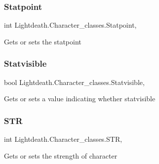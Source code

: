 \subsubsection{\texorpdfstring{Statpoint}{Statpoint}}
{\footnotesize\ttfamily int Lightdeath.\+Character\+\_\+classes.\+Statpoint\hspace{0.3cm}{\ttfamily [get]}, {\ttfamily [set]}}



Gets or sets the statpoint 

\hypertarget{class_lightdeath_1_1_character__classes_a1fa3c352e68bc979f5f4bd2aad54cff0}{}\label{class_lightdeath_1_1_character__classes_a1fa3c352e68bc979f5f4bd2aad54cff0} 
\subsubsection{\texorpdfstring{Statvisible}{Statvisible}}
{\footnotesize\ttfamily bool Lightdeath.\+Character\+\_\+classes.\+Statvisible\hspace{0.3cm}{\ttfamily [get]}, {\ttfamily [set]}}



Gets or sets a value indicating whether statvisible 

\hypertarget{class_lightdeath_1_1_character__classes_a9ff7bb19420750902a5422c57300e354}{}\label{class_lightdeath_1_1_character__classes_a9ff7bb19420750902a5422c57300e354} 
\subsubsection{\texorpdfstring{S\+TR}{STR}}
{\footnotesize\ttfamily int Lightdeath.\+Character\+\_\+classes.\+S\+TR\hspace{0.3cm}{\ttfamily [get]}, {\ttfamily [set]}}



Gets or sets the strength of character 

\hypertarget{class_lightdeath_1_1_character__classes_a2170ff333e7e3a186154f928db3b40df}{}\label{class_lightdeath_1_1_character__classes_a2170ff333e7e3a186154f928db3b40df} 
